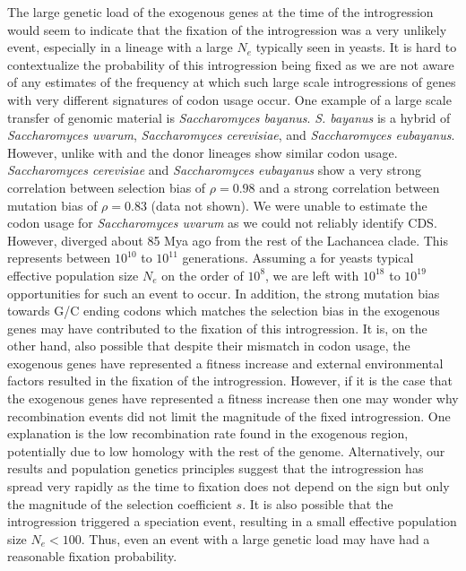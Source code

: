 The large genetic load of the exogenous genes at the time of the introgression would seem to indicate that the fixation of the introgression was a very unlikely event, especially in a lineage with a large $N_e$ typically seen in yeasts.
It is hard to contextualize the probability of this introgression being fixed as we are not aware of any estimates of the frequency at which such large scale introgressions of genes with very different signatures of codon usage occur.
One example of a large scale transfer of genomic material is \emph{Saccharomyces bayanus}.
\emph{S. bayanus} is a hybrid of \emph{Saccharomyces uvarum}, \emph{Saccharomyces cerevisiae}, and \emph{Saccharomyces eubayanus}.
However, unlike with \kluyveri and \gossypii the donor lineages show similar codon usage.
\emph{Saccharomyces cerevisiae} and \emph{Saccharomyces eubayanus} show a very strong correlation between selection bias \DE of $\rho = 0.98$ and a strong correlation between mutation bias \DM of $ \rho = 0.83$ (data not shown).
We were unable to estimate the codon usage for \emph{Saccharomyces uvarum} as we could not reliably identify CDS.
However, \kluyveri diverged about 85 Mya ago from the rest of the Lachancea clade.
This represents between $10^{10}$ to $10^{11}$ generations.
Assuming a for yeasts typical effective population size $N_e$ on the order of $10^8$, we are left with $10^{18}$ to $10^{19}$ opportunities for such an event to occur.
In addition, the strong mutation bias towards G/C ending codons which matches the selection bias in the exogenous genes may have contributed to the fixation of this introgression.
It is, on the other hand, also possible that despite their mismatch in codon usage, the exogenous genes have represented a fitness increase and external environmental factors resulted in the fixation of the introgression.
However, if it is the case that the exogenous genes have represented a fitness increase then one may wonder why recombination events did not limit the magnitude of the fixed introgression.
One explanation is the low recombination rate found in the exogenous region, potentially due to low homology with the rest of the genome.
Alternatively, our results and population genetics principles suggest that the introgression has spread very rapidly as the time to fixation does not depend on the sign but only the magnitude of the selection coefficient $s$.
It is also possible that the introgression triggered a speciation event, resulting in a small effective population size $N_e < 100$.
Thus, even an event with a large genetic load may have had a reasonable fixation probability.
 
